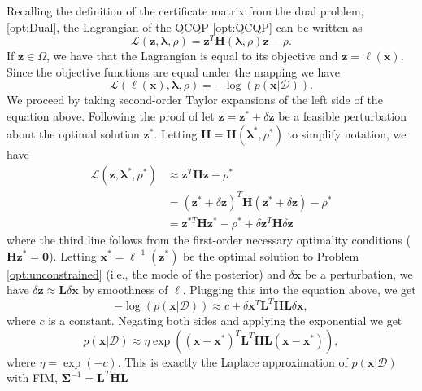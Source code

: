 \documentclass[lettersize,journal]{IEEEtran}
\begin{document}
Recalling the definition of the certificate matrix from the dual problem, \eqref{opt:Dual}, the Lagrangian of the QCQP \eqref{opt:QCQP} can be written as
\begin{equation*}
	\mathcal{L}(\bm{z},\bm{\lambda}, \rho) = \bm{z}^T \bm{H}(\bm{\lambda}, \rho) \bm{z} - \rho.
\end{equation*}
If $\bm{z} \in \Omega$, we have that the Lagrangian is equal to its objective and $\bm{z} = \bm{\ell}(\bm{x})$. Since the objective functions are equal under the mapping we have
\begin{equation*}
	\mathcal{L}(\bm{\ell}(\bm{x}),\bm{\lambda}, \rho) = -\log(p(\bm{x} \vert \bm{\mathcal{D}})).
\end{equation*}
We proceed by taking second-order Taylor expansions of the left side of the equation above. Following the proof of \cite[Theorem 12.5]{nocedalNumericalOptimization2006} let $\bm{z} = \bm{z}^*+\delta\bm{z}$ be a feasible perturbation about the optimal solution $\bm{z}^*$. Letting  $\bm{H}= \bm{H}(\bm{\lambda}^*, \rho^*)$ to simplify notation, we have
\begin{align*}
	\mathcal{L}(\bm{z},\bm{\lambda}^*, \rho^*) &\approx \bm{z}^T \bm{H} \bm{z} - \rho^* \\ 
	&= (\bm{z}^*+\delta\bm{z})^T \bm{H} (\bm{z}^*+\delta\bm{z}) - \rho^* \\ 
	&= \bm{z}^{*T} \bm{H}\bm{z}^{*} -\rho^* + \delta\bm{z}^T \bm{H}\delta\bm{z}
\end{align*}
where the third line follows from the first-order necessary optimality conditions ($\bm{H} \bm{z}^*=\bm{0}$). Letting $\bm{x}^* = \bm{\ell}^{-1}(\bm{z}^*)$ be the optimal solution to Problem \eqref{opt:unconstrained} (i.e., the mode of the posterior) and $\delta\bm{x}$ be a perturbation, we have $ \delta\bm{z} \approx \bm{L}\delta\bm{x}$ by smoothness of $\bm{\ell}$. Plugging this into the equation above, we get
\begin{equation*}
	-\log(p(\bm{x} \vert \bm{\mathcal{D}})) \approx c + \delta\bm{x}^T \bm{L}^T\bm{H}\bm{L}\delta\bm{x},
\end{equation*}
where $c$ is a constant. Negating both sides and applying the exponential we get
\begin{equation*}
	p(\bm{x} \vert \bm{\mathcal{D}}) \approx \eta\exp\left((\bm{x}-\bm{x}^*)^T \bm{L}^T\bm{H}\bm{L}(\bm{x}-\bm{x}^*)\right),
\end{equation*}
where $\eta = \exp(-c)$. This is exactly the Laplace approximation of $p(\bm{x} \vert \bm{\mathcal{D}})$ with FIM, $\bm{\Sigma}^{-1} = \bm{L}^T\bm{H}\bm{L}$
\end{document}
